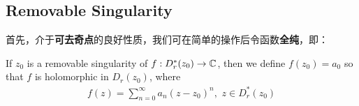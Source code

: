 \subsection{\textbf{Removable Singularity}}
	首先，介于\textbf{可去奇点}的良好性质，我们可在简单的操作后令函数\textbf{全纯}，即：
	\begin{rmk}
		If $z_0$ is a removable singularity of $f : D_{r}^{*}(z_0) \rightarrow \mathbb{C}$, then we define $f(z_0) = a_0$ so that $f$ is holomorphic in $D_{r}(z_0)$, where
		\begin{align}
			f(z) = \sum_{n = 0}^{\infty}{a_n (z - z_0)^n} , \,\, z \in D_{r}^{*}(z_0)
		\end{align}
	\end{rmk}
	
	\vspace{2em}

